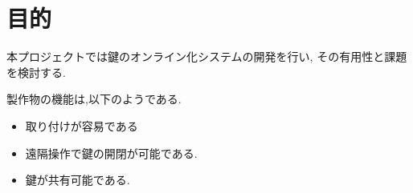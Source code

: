 \section{目的}
本プロジェクトでは鍵のオンライン化システムの開発を行い,
その有用性と課題を検討する.

製作物の機能は,以下のようである.

\begin{itemize}
  \item 取り付けが容易である
  \item 遠隔操作で鍵の開閉が可能である.
  \item 鍵が共有可能である.
\end{itemize}


